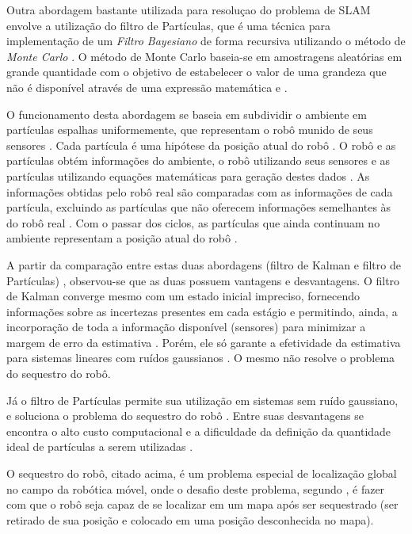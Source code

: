 Outra abordagem bastante utilizada para resoluçao do problema de SLAM envolve a utilização do filtro de Partículas, que é uma técnica para implementação de um \textit{Filtro Bayesiano} de forma recursiva utilizando o método de \textit{Monte Carlo} \cite{integrationVisionSLAMnonlinear}. O método de Monte Carlo baseia-se em amostragens aleatórias em grande quantidade com o objetivo de estabelecer o valor de uma grandeza que não é disponível através de uma expressão matemática \cite{mooney1997monte} e \cite{comparacaoKalmanParticulas}.

O funcionamento desta abordagem se baseia em subdividir o ambiente em partículas espalhas uniformemente, que representam o robô munido de seus sensores \cite{comparacaoKalmanParticulas}. Cada partícula é uma hipótese da posição atual do robô \cite{dp-slam}. O robô e as partículas obtém informações do ambiente, o robô utilizando seus sensores e as partículas utilizando equações matemáticas para geração destes dados \cite{comparacaoKalmanParticulas}. As informações obtidas pelo robô real são comparadas com as informações de cada partícula, excluindo as partículas que não oferecem informações semelhantes às do robô real \cite{comparacaoKalmanParticulas}. Com o passar dos ciclos, as partículas que ainda continuam no ambiente representam a posição atual do robô \cite{comparacaoKalmanParticulas}.

A partir da comparação entre estas duas abordagens (filtro de Kalman e filtro de Partículas) \cite{comparacaoKalmanParticulas}, observou-se que as duas possuem vantagens e desvantagens. O filtro de Kalman converge mesmo com um estado inicial impreciso, fornecendo informações sobre as incertezas presentes em cada estágio e permitindo, ainda, a incorporação de toda a informação disponível (sensores) para minimizar a margem de erro da estimativa \cite{comparacaoKalmanParticulas}. Porém, ele só garante a efetividade da estimativa para sistemas lineares com ruídos gaussianos \cite{comparacaoKalmanParticulas}. O mesmo não resolve o problema do sequestro do robô.

Já o filtro de Partículas permite sua utilização em sistemas sem ruído gaussiano, e soluciona o problema do sequestro do robô \cite{filtroParticulasComLEGO}. Entre suas desvantagens se encontra o alto custo computacional e a dificuldade da definição da quantidade ideal de partículas a serem utilizadas \cite{comparacaoKalmanParticulas}.

O sequestro do robô, citado acima, é um problema especial de localização global no campo da robótica móvel, onde o desafio deste problema, segundo \cite{sequestroRobo}, é fazer com que o robô seja capaz de se localizar em um mapa após ser sequestrado (ser retirado de sua posição e colocado em uma posição desconhecida no mapa).

